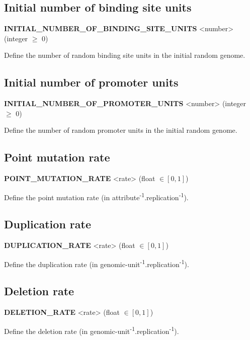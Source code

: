 
\subsection{Initial number of binding site units}
\begin{center}
{\bf INITIAL\_NUMBER\_OF\_BINDING\_SITE\_UNITS} <number> (integer $\ge$ 0)
\end{center}
Define the number of random binding site units in the initial random genome.


\subsection{Initial number of promoter units}
\begin{center}
{\bf INITIAL\_NUMBER\_OF\_PROMOTER\_UNITS} <number> (integer $\ge$ 0)
\end{center}
Define the number of random promoter units in the initial random genome.


\subsection{Point mutation rate}
\begin{center}
{\bf POINT\_MUTATION\_RATE} <rate> (float $\in [0, 1]$)
\end{center}
Define the point mutation rate (in attribute\textsuperscript{-1}.replication\textsuperscript{-1}).


\subsection{Duplication rate}
\begin{center}
{\bf DUPLICATION\_RATE} <rate> (float $\in [0, 1]$)
\end{center}
Define the duplication rate (in genomic-unit\textsuperscript{-1}.replication\textsuperscript{-1}).


\subsection{Deletion rate}
\begin{center}
{\bf DELETION\_RATE} <rate> (float $\in [0, 1]$)
\end{center}
Define the deletion rate (in genomic-unit\textsuperscript{-1}.replication\textsuperscript{-1}).

